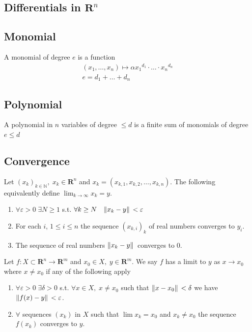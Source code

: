 \documentclass[8pt]{extarticle}
\newcommand{\R}{{\mathbb R}}
\newcommand{\X}{{\mathcal X}}
\newcommand{\ra}{{\rightarrow}}
\def\R{\mathbf{R}}
\def\X{X}
\begin{document}
\begin{multicols*}{3}
  \section{Differentials in $\R^n$}
  \hypertarget{sec:1}{}
  \subsection{Monomial}
  A monomial of degree $e$ is a function
  \begin{align*}
    (x_1, \dots, x_n) \mapsto \alpha {x_1}^{d_1} \cdot \ldots \cdot {x_n}^{d_n} \\
    e = d_1 + \ldots + d_n
  \end{align*}
  \subsection{Polynomial}
  A polynomial in $n$ variables of degree $\leq d$ is
  a finite sum of monomials of degree $e \leq d$
  \subsection{Convergence}
  Let $(x_k)_{k \in \mathbb{N}}, \; x_k \in \R^n$ and
  $x_k = (x_{k, 1}, x_{k, 2}, \dots, x_{k, n})$. The following
  equivalently define $\lim_{k \ra \infty} x_k = y$.
  \begin{enumerate}[label=(\arabic*)]
    \item $\forall \varepsilon > 0 \; \exists N \geq 1$ s.t.
          $\forall k \geq N \quad \norm*{x_k - y} < \varepsilon$
    \item For each $i$, $1 \leq i \leq n$ the sequence $(x_{k, i})_k$
          of real numbers converges to $y_i$.
    \item The sequence of real numbers $\norm*{x_k - y}$
          converges to $0$.
  \end{enumerate}
  Let $f: \X \subset \R^n \ra \R^m$
  and $x_0 \in \X, \; y \in \R^m$. We
  say $f$ has a limit to $y$ as $x \ra x_0$ where $x \neq x_0$
  if any of the following apply
  \begin{enumerate}[label=(\arabic*)]
    \item $\forall \varepsilon > 0 \; \exists \delta > 0$ s.t.
          $\forall x \in \X,\; x \neq x_0$ such that
          $\norm*{x - x_0} < \delta$ we have $\norm*{f(x) - y} < \varepsilon$.
    \item $\forall$ sequences $(x_k)$ in $\X$ such
          that $\lim x_k = x_0$ and $x_k \neq x_0$ the sequence
          $f(x_k)$ converges to $y$.
  \end{enumerate}

\end{multicols*}
\end{document}
